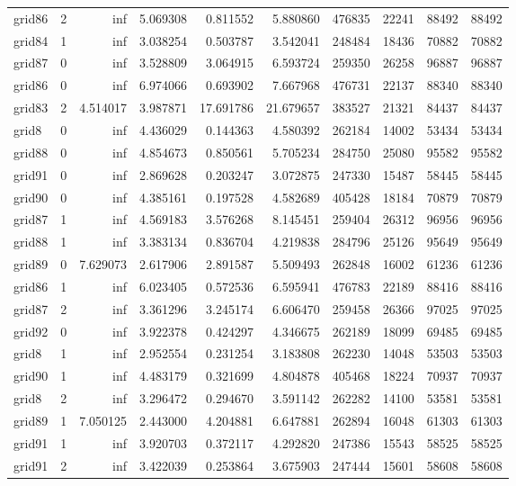 \begin{longtable}{|l|r|r|r|r|r|r|r|r|r|}
grid86 & 2 & inf & 5.069308 & 0.811552 & 5.880860 & 476835 & 22241 & 88492 & 88492 \\
grid84 & 1 & inf & 3.038254 & 0.503787 & 3.542041 & 248484 & 18436 & 70882 & 70882 \\
grid87 & 0 & inf & 3.528809 & 3.064915 & 6.593724 & 259350 & 26258 & 96887 & 96887 \\
grid86 & 0 & inf & 6.974066 & 0.693902 & 7.667968 & 476731 & 22137 & 88340 & 88340 \\
grid83 & 2 & 4.514017 & 3.987871 & 17.691786 & 21.679657 & 383527 & 21321 & 84437 & 84437 \\
grid8 & 0 & inf & 4.436029 & 0.144363 & 4.580392 & 262184 & 14002 & 53434 & 53434 \\
grid88 & 0 & inf & 4.854673 & 0.850561 & 5.705234 & 284750 & 25080 & 95582 & 95582 \\
grid91 & 0 & inf & 2.869628 & 0.203247 & 3.072875 & 247330 & 15487 & 58445 & 58445 \\
grid90 & 0 & inf & 4.385161 & 0.197528 & 4.582689 & 405428 & 18184 & 70879 & 70879 \\
grid87 & 1 & inf & 4.569183 & 3.576268 & 8.145451 & 259404 & 26312 & 96956 & 96956 \\
grid88 & 1 & inf & 3.383134 & 0.836704 & 4.219838 & 284796 & 25126 & 95649 & 95649 \\
grid89 & 0 & 7.629073 & 2.617906 & 2.891587 & 5.509493 & 262848 & 16002 & 61236 & 61236 \\
grid86 & 1 & inf & 6.023405 & 0.572536 & 6.595941 & 476783 & 22189 & 88416 & 88416 \\
grid87 & 2 & inf & 3.361296 & 3.245174 & 6.606470 & 259458 & 26366 & 97025 & 97025 \\
grid92 & 0 & inf & 3.922378 & 0.424297 & 4.346675 & 262189 & 18099 & 69485 & 69485 \\
grid8 & 1 & inf & 2.952554 & 0.231254 & 3.183808 & 262230 & 14048 & 53503 & 53503 \\
grid90 & 1 & inf & 4.483179 & 0.321699 & 4.804878 & 405468 & 18224 & 70937 & 70937 \\
grid8 & 2 & inf & 3.296472 & 0.294670 & 3.591142 & 262282 & 14100 & 53581 & 53581 \\
grid89 & 1 & 7.050125 & 2.443000 & 4.204881 & 6.647881 & 262894 & 16048 & 61303 & 61303 \\
grid91 & 1 & inf & 3.920703 & 0.372117 & 4.292820 & 247386 & 15543 & 58525 & 58525 \\
grid91 & 2 & inf & 3.422039 & 0.253864 & 3.675903 & 247444 & 15601 & 58608 & 58608 \\

\end{longtable}
